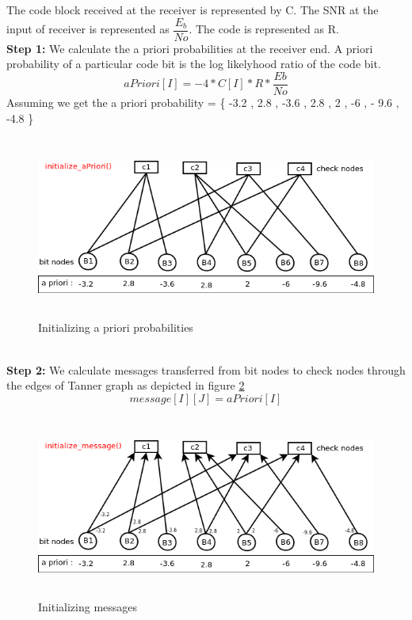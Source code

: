 The code block received at the receiver is represented by C. The SNR at the input of receiver is represented as $\dfrac{E_{b}}{No}$. The code is represented as R.
\\
\textbf{Step 1:} We calculate the a priori probabilities at the receiver end. A priori probability of a particular code bit is the log likelyhood ratio of the code bit.
\[  aPriori[I] = -4 * C[I] * R * \dfrac{Eb}{No} \]
Assuming we get the a priori probability = \{ -3.2 , 2.8 , -3.6 , 2.8 , 2 , -6 , - 9.6 , -4.8 \}
\begin{figure}[h!]
\centering
\includegraphics[height=6cm,width=12cm]{minSum2}
\caption[Initialization of a priori probabilities ]{Initializing a priori probabilities}
\label{minSum2}
\end{figure}
\\
\textbf{Step 2:}
We calculate messages transferred from bit nodes to check nodes through the edges of Tanner graph as depicted in figure \ref{minSum3}
 \[ message[I][J] = aPriori[I] \]
\begin{figure}[h!]
\centering
\includegraphics[height=6cm,width=12cm]{minSum3}
\caption[Initialization of messages]{Initializing messages}
\label{minSum3}
\end{figure}

